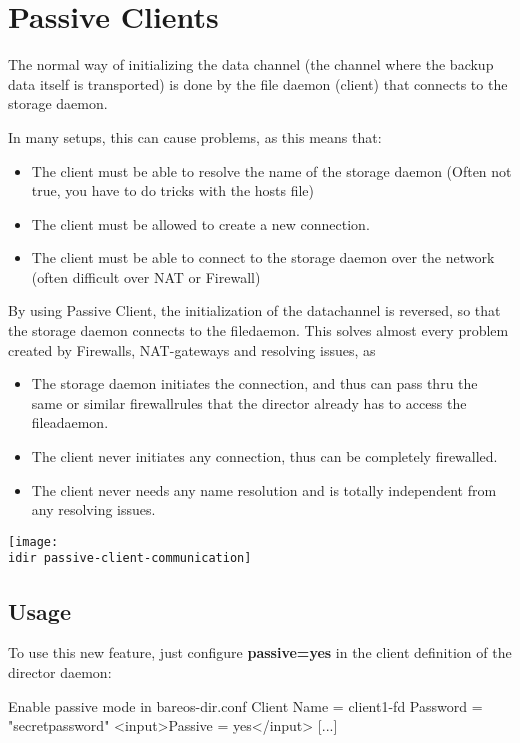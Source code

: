 \section{Passive Clients}
\label{PassiveClient}

The normal way of initializing the data channel (the channel where the backup data itself is transported)
is done by the file daemon (client) that connects to the storage daemon.

In many setups, this can cause problems, as this means that:
\begin{itemize}
    \item The client must be able to resolve the name of the storage daemon (Often not true, you have to do tricks with the hosts file)
    \item The client must be allowed to create a new connection.
    \item The client must be able to connect to the storage daemon over the network (often difficult over NAT or Firewall)
\end{itemize}

By using Passive Client, the initialization of the datachannel is reversed, so that the storage daemon connects to the filedaemon.
This solves almost every problem created by Firewalls, NAT-gateways and resolving issues, as

\begin{itemize}
    \item The storage daemon initiates the connection, and thus can pass thru the same or similar firewallrules that the director already has to access the fileadaemon.
    \item The client never initiates any connection, thus can be completely firewalled.
    \item The client never needs any name resolution and is totally independent from any resolving issues.
\end{itemize}

\begin{center}
\texttt{[image: \\idir passive-client-communication]}
\end{center}

\subsection{Usage}

To use this new feature, just configure  \textbf{passive=yes} in the client definition of the director daemon:
\begin{bconfig}{Enable passive mode in bareos-dir.conf}
Client {
   Name = client1-fd
   Password = "secretpassword"
   <input>Passive = yes</input>
   [...]
}
\end{bconfig}

